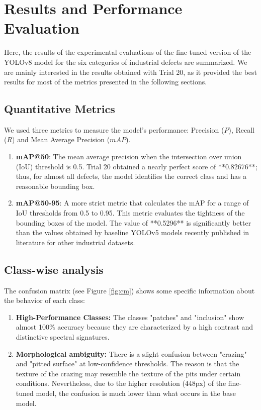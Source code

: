 \chapter{Results and Performance Evaluation}
\label{sec:results}

Here, the results of the experimental evaluations of the fine-tuned version of the YOLOv8 model for the six categories of industrial defects are summarized. We are mainly interested in the results obtained with Trial 20, as it provided the best results for most of the metrics presented in the following sections.

\section{Quantitative Metrics}
We used three metrics to measure the model's performance: Precision ($P$), Recall ($R$) and Mean Average Precision ($mAP$).

\begin{enumerate}
\item \textbf{mAP@50}: The mean average precision when the intersection over union (IoU) threshold is 0.5. Trial 20 obtained a nearly perfect score of **0.82676**; thus, for almost all defects, the model identifies the correct class and has a reasonable bounding box.
\item \textbf{mAP@50-95}: A more strict metric that calculates the mAP for a range of IoU thresholds from 0.5 to 0.95. This metric evaluates the tightness of the bounding boxes of the model. The value of **0.5296** is significantly better than the values obtained by baseline YOLOv5 models recently published in literature for other industrial datasets.
\end{enumerate}

\section{Class-wise analysis}
The confusion matrix (see Figure \ref{fig:cm}) shows some specific information about the behavior of each class:
\begin{enumerate}
\item \textbf{High-Performance Classes:} The classes "patches" and "inclusion" show almost 100\% accuracy because they are characterized by a high contrast and distinctive spectral signatures.
\item \textbf{Morphological ambiguity:} There is a slight confusion between "crazing" and "pitted surface" at low-confidence thresholds. The reason is that the texture of the crazing may resemble the texture of the pits under certain conditions. Nevertheless, due to the higher resolution (448px) of the fine-tuned model, the confusion is much lower than what occurs in the base model.
\end{enumerate}

